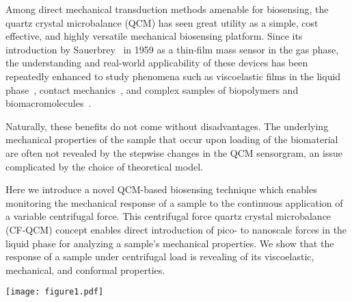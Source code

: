 \documentclass[floatfix,superscriptaddress,a4paper,twocolumn]{revtex4-1}
\let\oldsqrt\sqrt
\def\sqrt{\mathpalette\DHLhksqrt}
\def\DHLhksqrt#1#2{%
\setbox0=\hbox{$#1\oldsqrt{#2\,}$}\dimen0=\ht0
\advance\dimen0-0.2\ht0
\setbox2=\hbox{\vrule height\ht0 depth -\dimen0}%
{\box0\lower0.4pt\box2}}
\begin{document}
Among direct mechanical transduction methods amenable for biosensing, the
quartz crystal microbalance (QCM) has seen great utility as a simple, cost
effective, and highly versatile mechanical biosensing platform.  Since its
introduction by Sauerbrey~\cite{sauerbrey1959verwendung} in 1959 as a
thin-film mass sensor in the gas phase, the understanding and real-world
applicability of these devices has been repeatedly enhanced
to study phenomena such as viscoelastic films in the liquid
phase~\cite{kanazawa1985frequency}, contact
mechanics~\cite{johannsman2007contacts}, and complex samples of biopolymers
and biomacromolecules~\cite{marx2003quartz}.

Naturally, these benefits do not come without disadvantages. The
underlying mechanical properties of the sample that occur upon loading of
the biomaterial are often not revealed by the stepwise changes in the QCM
sensorgram, an issue complicated by the choice of theoretical model.

Here we introduce a novel QCM-based biosensing technique which enables
monitoring the mechanical response of a sample to the continuous
application of a variable centrifugal force.  This centrifugal force quartz
crystal microbalance (CF-QCM) concept enables direct introduction of pico-
to nanoscale forces in the liquid phase for analyzing a sample's mechanical
properties.  We show that the response of a sample under
centrifugal load is revealing of its viscoelastic, mechanical, and conformal
properties.
\begin{figure*}[ht]
\centering
\texttt{[image: figure1.pdf]}
\caption{Overview of the CF-QCM\@.  (a) Experimental setup.  A QCM and its driver are integrated into one
arm of a standard swinging bucket centrifuge.  Data acquisition is done
electrically through a tether and a centrally mounted slip ring.  When
spinning, centrifugal force is applied to a sample under assay. Here
$F_\mathrm{c} \equiv m \sqrt{a_\mathrm{c}^2 +a_\mathrm{g}^2}$, where
$a_\mathrm{c}=\omega^2 R$ and $a_\mathrm{g}$ are centripetal and gravitational
accelerations, respectively.  (b)
Example CF-QCM experiment with \SI{1}{\micro\meter} particles in water,
$N_\mathrm{L}=\SI{1.58e11}{\particle\per\meter\squared}$, in the
``loading'' configuration (inset).  The horizontal arrows indicate the
motion of the QCM's transverse shear mode.
The spin up to \SI{90}{g} in
loading configuration enhances the QCM frequency shift signal and allows
extraction of mechanical properties of the sample, as well as particle
size. See text for details.
}
\label{fig:expsetup}
\end{figure*}
\end{document}
